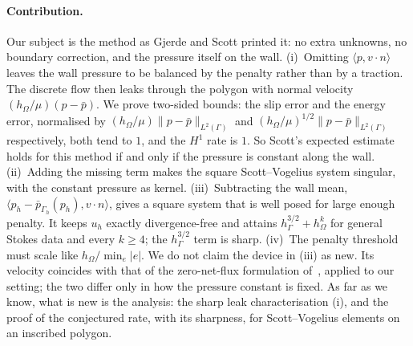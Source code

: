 \paragraph{Contribution.}
Our subject is the method as Gjerde and Scott printed it: no extra unknowns, no boundary correction, and the pressure itself on the wall. (i)~Omitting $\langle p,v\cdot n\rangle$ leaves the wall pressure to be balanced by the penalty rather than by a traction. The discrete flow then leaks through the polygon with normal velocity $(h_\Omega/\mu)(p-\bar p)$. We prove two-sided bounds: the slip error and the energy error, normalised by $(h_\Omega/\mu)\|p-\bar p\|_{L^2(\Gamma)}$ and $(h_\Omega/\mu)^{1/2}\|p-\bar p\|_{L^2(\Gamma)}$ respectively, both tend to $1$, and the $H^1$ rate is $1$. So Scott's expected estimate holds for this method if and only if the pressure is constant along the wall. (ii)~Adding the missing term makes the square Scott--Vogelius system singular, with the constant pressure as kernel. (iii)~Subtracting the wall mean, $\langle p_h-\bar p_{\Gamma_h}(p_h),v\cdot n\rangle$, gives a square system that is well posed for large enough penalty. It keeps $u_h$ exactly divergence-free and attains $h_\Gamma^{3/2}+h_\Omega^k$ for general Stokes data and every $k\ge4$; the $h_\Gamma^{3/2}$ term is sharp. (iv)~The penalty threshold must scale like $h_\Omega/\min_{e}|e|$. We do not claim the device in (iii) as new. Its velocity coincides with that of the zero-net-flux formulation of~\cite{FrachonNilssonZahedi2024}, applied to our setting; the two differ only in how the pressure constant is fixed. As far as we know, what is new is the analysis: the sharp leak characterisation (i), and the proof of the conjectured rate, with its sharpness, for Scott--Vogelius elements on an inscribed polygon.

